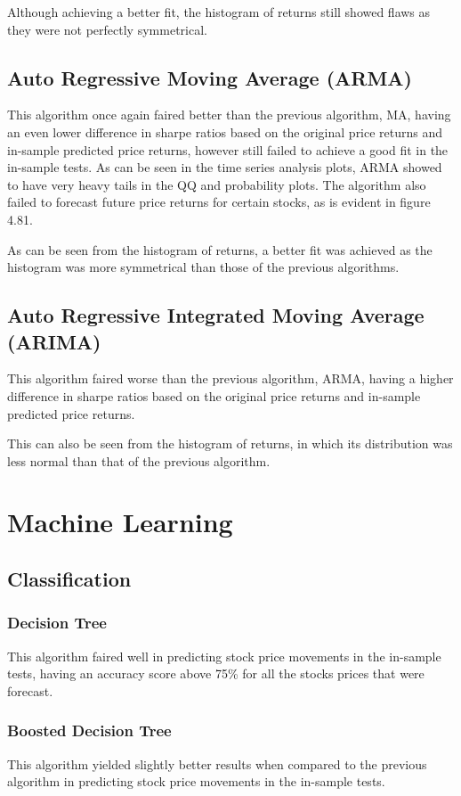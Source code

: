 Although achieving a better fit, the histogram of returns still showed flaws as they were not perfectly symmetrical.

\subsection{Auto Regressive Moving Average (ARMA)}
This algorithm once again faired better than the previous algorithm, MA, having an even lower difference in sharpe ratios based on the original price returns and in-sample predicted price returns, however still failed to achieve a good fit in the in-sample tests. As can be seen in the time series analysis plots, ARMA showed to have very heavy tails in the QQ and probability plots. The algorithm also failed to forecast future price returns for certain stocks, as is evident in figure 4.81.

As can be seen from the histogram of returns, a better fit was achieved as the histogram was more symmetrical than those of the previous algorithms.

\subsection{Auto Regressive Integrated Moving Average (ARIMA)}
This algorithm faired worse than the previous algorithm, ARMA, having a higher difference in sharpe ratios based on the original price returns and in-sample predicted price returns.

This can also be seen from the histogram of returns, in which its distribution was less normal than that of the previous algorithm.

\section{Machine Learning}

\subsection{Classification}

\subsubsection{Decision Tree}
This algorithm faired well in predicting stock price movements in the in-sample tests, having an accuracy score above 75\% for all the stocks prices that were forecast.

\subsubsection{Boosted Decision Tree}
This algorithm yielded slightly better results when compared to the previous algorithm in predicting stock price movements in the in-sample tests.

